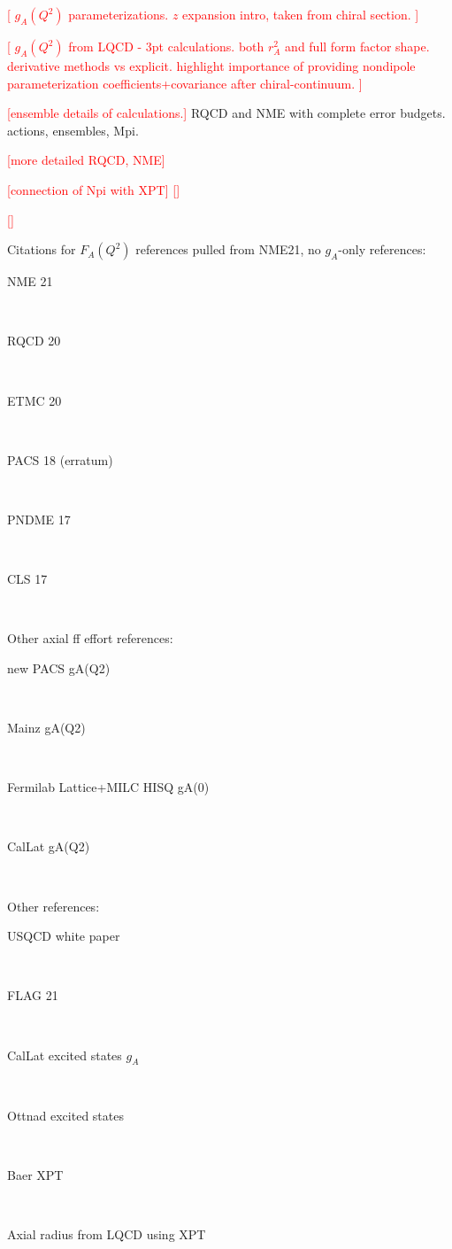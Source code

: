 \textcolor{red}{[
 $g_A(Q^2)$ parameterizations.
 $z$ expansion intro, taken from chiral section.
]}

\textcolor{red}{[
$g_A(Q^2)$ from LQCD - 3pt calculations.
both $r_A^2$ and full form factor shape.
derivative methods vs explicit.
highlight importance of providing nondipole parameterization
 coefficients+covariance after chiral-continuum.
]}

\textcolor{red}{[ensemble details of calculations.]}
RQCD and NME with complete error budgets.
actions, ensembles, Mpi.

\textcolor{red}{[more detailed RQCD, NME]}

\textcolor{red}{[connection of Npi with XPT]}
\textcolor{red}{[]}

\textcolor{red}{[]}

Citations for $F_A(Q^2)$ references pulled from NME21, no $g_A$-only references:
\begin{description}
\item[NME 21]~\cite{Park:2021ypf}
\item[RQCD 20]~\cite{Bali:2018qus,RQCD:2019jai} %
\item[ETMC 20]~\cite{Alexandrou:2018sjm,Alexandrou:2019brg,Alexandrou:2020okk} %
\item[PACS 18 (erratum)]~\cite{Ishikawa:2018rew,Shintani:2018ozy} %
\item[PNDME 17]~\cite{Gupta:2017dwj,Gupta:2018qil,Jang:2019vkm,Jang:2019jkn} %
\item[CLS 17]~\cite{Hasan:2017wwt,Hasan:2019noy} %
\end{description}
Other axial ff effort references:
\begin{description}
\item[new PACS gA(Q2)]~\cite{Ishikawa:2021eut}
\item[Mainz gA(Q2)]~\cite{Djukanovic:2021yqg}
\item[Fermilab Lattice+MILC HISQ gA(0)]~\cite{Lin:2020wko}
\item[CalLat gA(Q2)]~\cite{Meyer:2021vfq}
\end{description}
Other references:
\begin{description}
\item[USQCD white paper]~\cite{Kronfeld:2019nfb}
\item[FLAG 21]~\cite{Aoki:2021kgd}
\item[CalLat excited states $g_A$]~\cite{He:2021yvm}
\item[Ottnad excited states]~\cite{Ottnad:2020qbw}
\item[Baer XPT]~\cite{Bar:2018xyi,Bar:2019igf}
\item[Axial radius from LQCD using XPT]~\cite{Yao:2017fym}
\end{description}

